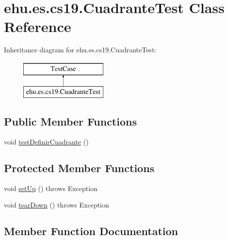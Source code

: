 \hypertarget{classehu_1_1es_1_1cs19_1_1_cuadrante_test}{}\section{ehu.\+es.\+cs19.\+Cuadrante\+Test Class Reference}
\label{classehu_1_1es_1_1cs19_1_1_cuadrante_test}
Inheritance diagram for ehu.\+es.\+cs19.\+Cuadrante\+Test\+:\begin{figure}[H]
\begin{center}
\leavevmode
\includegraphics[height=2.000000cm]{classehu_1_1es_1_1cs19_1_1_cuadrante_test}
\end{center}
\end{figure}
\subsection*{Public Member Functions}
\begin{DoxyCompactItemize}
\item 
void \mbox{\hyperlink{classehu_1_1es_1_1cs19_1_1_cuadrante_test_a6ca722f12b7c56a795ce28675ad55379}{test\+Definir\+Cuadrante}} ()
\end{DoxyCompactItemize}
\subsection*{Protected Member Functions}
\begin{DoxyCompactItemize}
\item 
void \mbox{\hyperlink{classehu_1_1es_1_1cs19_1_1_cuadrante_test_abec09889ac86d3308d00da5df2d08a32}{set\+Up}} ()  throws Exception 
\item 
void \mbox{\hyperlink{classehu_1_1es_1_1cs19_1_1_cuadrante_test_afea9541f98f4033d93cfed1eefd4d6a8}{tear\+Down}} ()  throws Exception 
\end{DoxyCompactItemize}


\subsection{Member Function Documentation}
\mbox{\label{classehu_1_1es_1_1cs19_1_1_cuadrante_test_abec09889ac86d3308d00da5df2d08a32}} 

